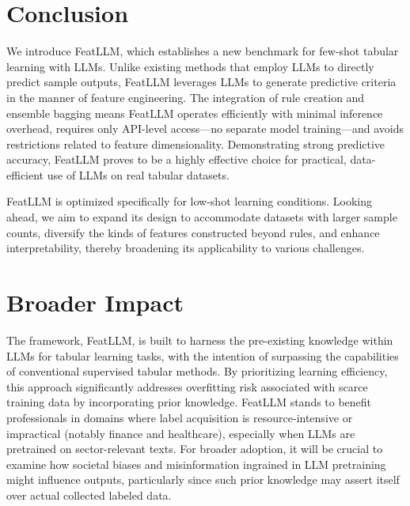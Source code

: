 \section{Conclusion}
We introduce \textsf{FeatLLM}, which establishes a new benchmark for few-shot tabular learning with LLMs. Unlike existing methods that employ LLMs to directly predict sample outputs, \textsf{FeatLLM} leverages LLMs to generate predictive criteria in the manner of feature engineering. The integration of rule creation and ensemble bagging means \textsf{FeatLLM} operates efficiently with minimal inference overhead, requires only API-level access—no separate model training—and avoids restrictions related to feature dimensionality. Demonstrating strong predictive accuracy, \textsf{FeatLLM} proves to be a highly effective choice for practical, data-efficient use of LLMs on real tabular datasets.

\textsf{FeatLLM} is optimized specifically for low-shot learning conditions. Looking ahead, we aim to expand its design to accommodate datasets with larger sample counts, diversify the kinds of features constructed beyond rules, and enhance interpretability, thereby broadening its applicability to various challenges.

\section{Broader Impact}
The framework, \textsf{FeatLLM}, is built to harness the pre-existing knowledge within LLMs for tabular learning tasks, with the intention of surpassing the capabilities of conventional supervised tabular methods. By prioritizing learning efficiency, this approach significantly addresses overfitting risk associated with scarce training data by incorporating prior knowledge. \textsf{FeatLLM} stands to benefit professionals in domains where label acquisition is resource-intensive or impractical (notably finance and healthcare), especially when LLMs are pretrained on sector-relevant texts. For broader adoption, it will be crucial to examine how societal biases and misinformation ingrained in LLM pretraining might influence outputs, particularly since such prior knowledge may assert itself over actual collected labeled data.


